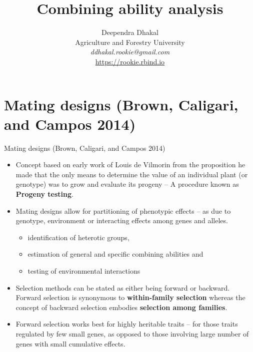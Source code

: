 \documentclass[11pt,dvipsnames,ignorenonframetext,aspectratio=169]{beamer}
\title[]{Combining ability analysis}
\author[
        Deependra Dhakal\\
Agriculture and Forestry University\\
\textit{ddhakal.rookie@gmail.com}\\
\url{https://rookie.rbind.io}
    ]{Deependra Dhakal\\
Agriculture and Forestry University\\
\textit{ddhakal.rookie@gmail.com}\\
\url{https://rookie.rbind.io}}
\date[
      
  ]{
    }
\providecommand{\tightlist}{%
  \setlength{\itemsep}{0pt}\setlength{\parskip}{0pt}}
\begin{document}
  \begin{frame}[plain]
  \titlepage
  \end{frame}



\hypertarget{mating-designs-brown2014plantbreeding}{%
\section{Mating designs (Brown, Caligari, and Campos
2014)}\label{mating-designs-brown2014plantbreeding}}

\begin{frame}{Mating designs (Brown, Caligari, and Campos 2014)}
\begin{itemize}
\tightlist
\item
  Concept based on early work of Louis de Vilmorin from the proposition
  he made that the only means to determine the value of an individual
  plant (or genotype) was to grow and evaluate its progeny -- A
  procedure known as \textbf{Progeny testing}.
\item
  Mating designs allow for partitioning of phenotypic effects -- as due
  to genotype, environment or interacting effects among genes and
  alleles.

  \begin{itemize}
  \tightlist
  \item
    identification of heterotic groups,
  \item
    estimation of general and specific combining abilities and
  \item
    testing of environmental interactions
  \end{itemize}
\item
  Selection methods can be stated as either being forward or backward.
  Forward selection is synonymous to \textbf{within-family selection}
  whereas the concept of backward selection embodies \textbf{selection
  among families}.
\item
  Forward selection works best for highly heritable traits -- for those
  traits regulated by few small genes, as opposed to those involving
  large number of genes with small cumulative effects.
\end{itemize}
\end{frame}
\end{document}
